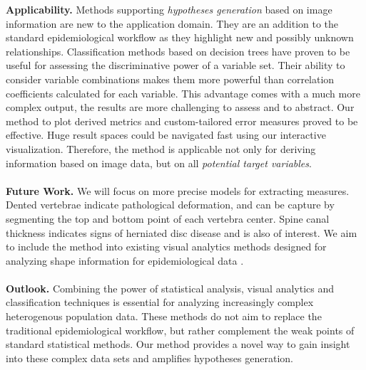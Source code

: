 \documentclass[a4paper,twoside]{style/article}
\begin{document}
\noindent \textbf{Applicability.}
Methods supporting \emph{hypotheses generation} based on image information are new to the application domain.
They are an addition to the standard epidemiological workflow as they highlight new and possibly unknown relationships.
Classification methods based on decision trees have proven to be useful for assessing the discriminative power of a variable set.
Their ability to consider variable combinations makes them more powerful than correlation coefficients calculated for each variable.
This advantage comes with a much more complex output, the results are more challenging to assess and to abstract.
Our method to plot derived metrics and custom-tailored error measures proved to be effective.
Huge result spaces could be navigated fast using our interactive visualization.
Therefore, the method is applicable not only for deriving information based on image data, but on all \emph{potential target variables}.
\\\\
\noindent \textbf{Future Work.}
We will focus on more precise models for extracting measures.
Dented vertebrae indicate pathological deformation, and can be capture by segmenting the top and bottom point of each vertebra center.
Spine canal thickness indicates signs of herniated disc disease and is also of interest.
We aim to include the method into existing visual analytics methods designed for analyzing shape information for epidemiological data \cite{Klemm2014VIS}.
\\\\
\noindent \textbf{Outlook.}
Combining the power of statistical analysis, visual analytics and classification techniques is essential for analyzing increasingly complex heterogenous population data.
These methods do not aim to replace the traditional epidemiological workflow, but rather complement the weak points of standard statistical methods.
Our method provides a novel way to gain insight into these complex data sets and amplifies hypotheses generation.
\end{document}
